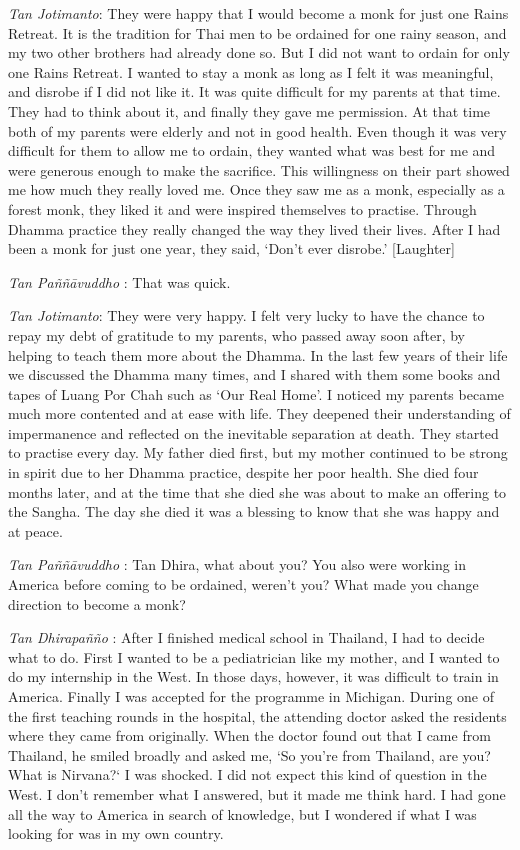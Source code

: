 \emph{Tan Jotimanto}: They were happy that I would become a monk for
just one Rains Retreat. It is the tradition for Thai men to be ordained
for one rainy season, and my two other brothers had already done so. But
I did not want to ordain for only one Rains Retreat. I wanted to stay a
monk as long as I felt it was meaningful, and disrobe if I did not like
it. It was quite difficult for my parents at that time. They had to
think about it, and finally they gave me permission. At that time both
of my parents were elderly and not in good health. Even though it was
very difficult for them to allow me to ordain, they wanted what was best
for me and were generous enough to make the sacrifice. This willingness
on their part showed me how much they really loved me. Once they saw me
as a monk, especially as a forest monk, they liked it and were inspired
themselves to practise. Through Dhamma practice they really changed the
way they lived their lives. After I had been a monk for just one year,
they said, `Don't ever disrobe.' {[}Laughter{]}

\emph{Tan Paññāvuddho} : That was quick.

\emph{Tan Jotimanto}: They were very happy. I felt very lucky to have
the chance to repay my debt of gratitude to my parents, who passed away
soon after, by helping to teach them more about the Dhamma. In the last
few years of their life we discussed the Dhamma many times, and I shared
with them some books and tapes of Luang Por Chah such as `Our Real
Home'. I noticed my parents became much more contented and at ease with
life. They deepened their understanding of impermanence and reflected on
the inevitable separation at death. They started to practise every day.
My father died first, but my mother continued to be strong in spirit due
to her Dhamma practice, despite her poor health. She died four months
later, and at the time that she died she was about to make an offering
to the Sangha. The day she died it was a blessing to know that she was
happy and at peace.

\emph{Tan Paññāvuddho} : Tan Dhira, what about you? You also were
working in America before coming to be ordained, weren't you? What made
you change direction to become a monk?

\emph{Tan Dhirapañño} : After I finished medical school in Thailand, I
had to decide what to do. First I wanted to be a pediatrician like my
mother, and I wanted to do my internship in the West. In those days,
however, it was difficult to train in America. Finally I was accepted
for the programme in Michigan. During one of the first teaching rounds
in the hospital, the attending doctor asked the residents where they
came from originally. When the doctor found out that I came from
Thailand, he smiled broadly and asked me, `So you're from Thailand, are
you? What is Nirvana?` I was shocked. I did not expect this kind of
question in the West. I don't remember what I answered, but it made me
think hard. I had gone all the way to America in search of knowledge,
but I wondered if what I was looking for was in my own country.

